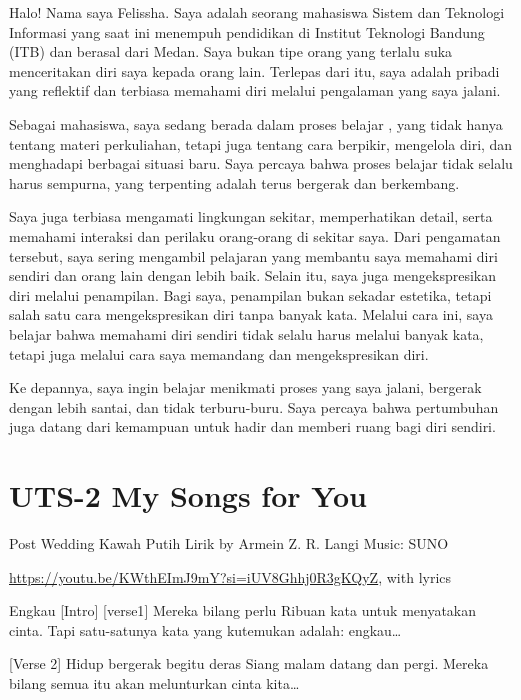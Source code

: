 \documentclass[
  letterpaper,
  DIV=11,
  numbers=noendperiod]{scrreprt}
\begin{document}
Halo! Nama saya Felissha. Saya adalah seorang mahasiswa Sistem dan
Teknologi Informasi yang saat ini menempuh pendidikan di Institut
Teknologi Bandung (ITB) dan berasal dari Medan. Saya bukan tipe orang
yang terlalu suka menceritakan diri saya kepada orang lain. Terlepas
dari itu, saya adalah pribadi yang reflektif dan terbiasa memahami diri
melalui pengalaman yang saya jalani.

Sebagai mahasiswa, saya sedang berada dalam proses belajar , yang tidak
hanya tentang materi perkuliahan, tetapi juga tentang cara berpikir,
mengelola diri, dan menghadapi berbagai situasi baru. Saya percaya bahwa
proses belajar tidak selalu harus sempurna, yang terpenting adalah terus
bergerak dan berkembang.

Saya juga terbiasa mengamati lingkungan sekitar, memperhatikan detail,
serta memahami interaksi dan perilaku orang-orang di sekitar saya. Dari
pengamatan tersebut, saya sering mengambil pelajaran yang membantu saya
memahami diri sendiri dan orang lain dengan lebih baik. Selain itu, saya
juga mengekspresikan diri melalui penampilan. Bagi saya, penampilan
bukan sekadar estetika, tetapi salah satu cara mengekspresikan diri
tanpa banyak kata. Melalui cara ini, saya belajar bahwa memahami diri
sendiri tidak selalu harus melalui banyak kata, tetapi juga melalui cara
saya memandang dan mengekspresikan diri.

Ke depannya, saya ingin belajar menikmati proses yang saya jalani,
bergerak dengan lebih santai, dan tidak terburu-buru. Saya percaya bahwa
pertumbuhan juga datang dari kemampuan untuk hadir dan memberi ruang
bagi diri sendiri.


\chapter{UTS-2 My Songs for You}\label{uts-2-my-songs-for-you}

Post Wedding Kawah Putih Lirik by Armein Z. R. Langi Music: SUNO

\url{https://youtu.be/KWthEImJ9mY?si=iUV8Ghhj0R3gKQyZ}, with lyrics

Engkau {[}Intro{]} {[}verse1{]} Mereka bilang perlu Ribuan kata untuk
menyatakan cinta. Tapi satu-satunya kata yang kutemukan adalah:
engkau\ldots{}

{[}Verse 2{]} Hidup bergerak begitu deras Siang malam datang dan pergi.
Mereka bilang semua itu akan melunturkan cinta kita\ldots{}
\end{document}
